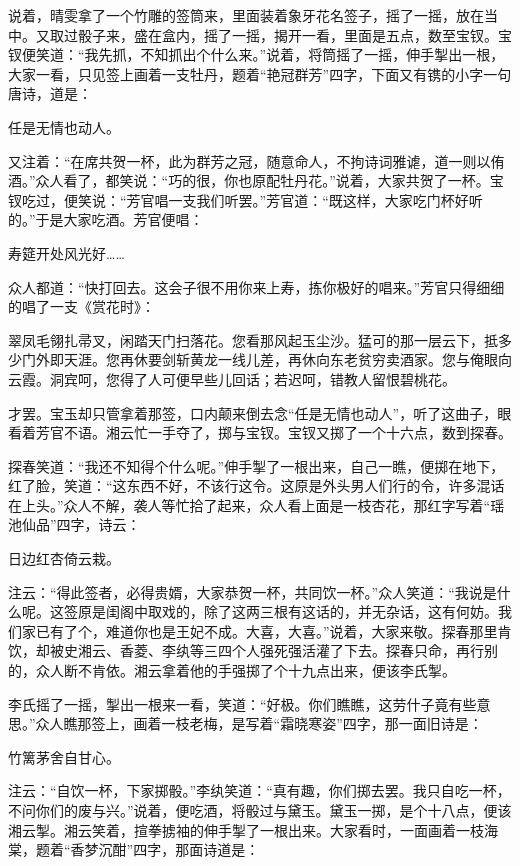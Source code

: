 说着，晴雯拿了一个竹雕的签筒来，里面装着象牙花名签子，摇了一摇，放在当中。又取过骰子来，盛在盒内，摇了一摇，揭开一看，里面是五点，数至宝钗。宝钗便笑道：``我先抓，不知抓出个什么来。''说着，将筒摇了一摇，伸手掣出一根，大家一看，只见签上画着一支牡丹，题着``艳冠群芳''四字，下面又有镌的小字一句唐诗，道是：

任是无情也动人。

又注着：``在席共贺一杯，此为群芳之冠，随意命人，不拘诗词雅谑，道一则以侑酒。''众人看了，都笑说：``巧的很，你也原配牡丹花。''说着，大家共贺了一杯。宝钗吃过，便笑说：``芳官唱一支我们听罢。''芳官道：``既这样，大家吃门杯好听的。''于是大家吃酒。芳官便唱：

寿筵开处风光好\ldots{}\ldots{}

众人都道：``快打回去。这会子很不用你来上寿，拣你极好的唱来。''芳官只得细细的唱了一支《赏花时》：

翠凤毛翎扎帚叉，闲踏天门扫落花。您看那风起玉尘沙。猛可的那一层云下，抵多少门外即天涯。您再休要剑斩黄龙一线儿差，再休向东老贫穷卖酒家。您与俺眼向云霞。洞宾呵，您得了人可便早些儿回话；若迟呵，错教人留恨碧桃花。

才罢。宝玉却只管拿着那签，口内颠来倒去念``任是无情也动人''，听了这曲子，眼看着芳官不语。湘云忙一手夺了，掷与宝钗。宝钗又掷了一个十六点，数到探春。

探春笑道：``我还不知得个什么呢。''伸手掣了一根出来，自己一瞧，便掷在地下，红了脸，笑道：``这东西不好，不该行这令。这原是外头男人们行的令，许多混话在上头。''众人不解，袭人等忙拾了起来，众人看上面是一枝杏花，那红字写着``瑶池仙品''四字，诗云：

日边红杏倚云栽。

注云：``得此签者，必得贵婿，大家恭贺一杯，共同饮一杯。''众人笑道：``我说是什么呢。这签原是闺阁中取戏的，除了这两三根有这话的，并无杂话，这有何妨。我们家已有了个，难道你也是王妃不成。大喜，大喜。''说着，大家来敬。探春那里肯饮，却被史湘云、香菱、李纨等三四个人强死强活灌了下去。探春只命，再行别的，众人断不肯依。湘云拿着他的手强掷了个十九点出来，便该李氏掣。

李氏摇了一摇，掣出一根来一看，笑道：``好极。你们瞧瞧，这劳什子竟有些意思。''众人瞧那签上，画着一枝老梅，是写着``霜晓寒姿''四字，那一面旧诗是：

竹篱茅舍自甘心。

注云：``自饮一杯，下家掷骰。''李纨笑道：``真有趣，你们掷去罢。我只自吃一杯，不问你们的废与兴。''说着，便吃酒，将骰过与黛玉。黛玉一掷，是个十八点，便该湘云掣。湘云笑着，揎拳掳袖的伸手掣了一根出来。大家看时，一面画着一枝海棠，题着``香梦沉酣''四字，那面诗道是：

